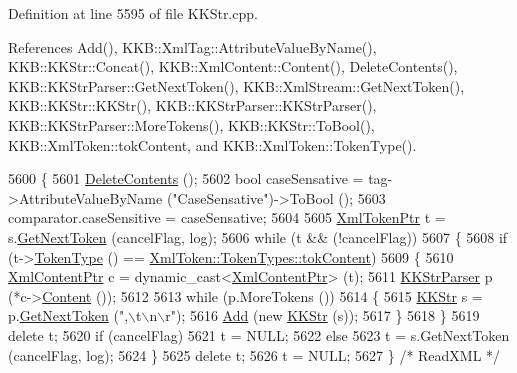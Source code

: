 Definition at line 5595 of file K\+K\+Str.\+cpp.



References Add(), K\+K\+B\+::\+Xml\+Tag\+::\+Attribute\+Value\+By\+Name(), K\+K\+B\+::\+K\+K\+Str\+::\+Concat(), K\+K\+B\+::\+Xml\+Content\+::\+Content(), Delete\+Contents(), K\+K\+B\+::\+K\+K\+Str\+Parser\+::\+Get\+Next\+Token(), K\+K\+B\+::\+Xml\+Stream\+::\+Get\+Next\+Token(), K\+K\+B\+::\+K\+K\+Str\+::\+K\+K\+Str(), K\+K\+B\+::\+K\+K\+Str\+Parser\+::\+K\+K\+Str\+Parser(), K\+K\+B\+::\+K\+K\+Str\+Parser\+::\+More\+Tokens(), K\+K\+B\+::\+K\+K\+Str\+::\+To\+Bool(), K\+K\+B\+::\+Xml\+Token\+::tok\+Content, and K\+K\+B\+::\+Xml\+Token\+::\+Token\+Type().


\begin{DoxyCode}
5600 \{
5601   \hyperlink{class_k_k_b_1_1_k_k_str_list_indexed_a4f50f6d7735d2e344c8879277c5096b7}{DeleteContents} ();
5602   \textcolor{keywordtype}{bool}  caseSensative = tag->AttributeValueByName (\textcolor{stringliteral}{"CaseSensative"})->ToBool ();
5603   comparator.caseSensitive = caseSensative;
5604 
5605   \hyperlink{class_k_k_b_1_1_xml_token}{XmlTokenPtr}  t = s.\hyperlink{class_k_k_b_1_1_xml_stream_a87cc738b05c666cf5d5c25beaab477b4}{GetNextToken} (cancelFlag, log);
5606   \textcolor{keywordflow}{while}  (t  &&  (!cancelFlag))
5607   \{
5608     \textcolor{keywordflow}{if}  (t->\hyperlink{class_k_k_b_1_1_xml_token_ae98e2c1a798882647578cae4adcd7176}{TokenType} () == \hyperlink{class_k_k_b_1_1_xml_token_a18b6e90c919f4b92e3b024f50f247f62aff369b5479984ca659548f37ad4caec9}{XmlToken::TokenTypes::tokContent})
5609     \{
5610       \hyperlink{class_k_k_b_1_1_xml_content}{XmlContentPtr} c = \textcolor{keyword}{dynamic\_cast<}\hyperlink{class_k_k_b_1_1_xml_content}{XmlContentPtr}\textcolor{keyword}{>} (t);
5611       \hyperlink{class_k_k_b_1_1_k_k_str_parser}{KKStrParser} p (*c->\hyperlink{class_k_k_b_1_1_xml_content_a1d0730aae45b069e8604bef19b8c0098}{Content} ());
5612 
5613       \textcolor{keywordflow}{while}  (p.MoreTokens ())
5614       \{
5615         \hyperlink{class_k_k_b_1_1_k_k_str}{KKStr}  s = p.\hyperlink{class_k_k_b_1_1_xml_stream_a87cc738b05c666cf5d5c25beaab477b4}{GetNextToken} (\textcolor{stringliteral}{",\(\backslash\)t\(\backslash\)n\(\backslash\)r"});
5616         \hyperlink{class_k_k_b_1_1_k_k_str_list_indexed_a70e2b10a57a8e0bb62f0f50087bbebd5}{Add} (\textcolor{keyword}{new} \hyperlink{class_k_k_b_1_1_k_k_str}{KKStr} (s));
5617       \}
5618     \}
5619     \textcolor{keyword}{delete}  t;
5620     \textcolor{keywordflow}{if}  (cancelFlag)
5621       t = NULL;
5622     \textcolor{keywordflow}{else}
5623       t = s.GetNextToken (cancelFlag, log);
5624   \}
5625   \textcolor{keyword}{delete}  t;
5626   t = NULL;
5627 \}  \textcolor{comment}{/* ReadXML */}
\end{DoxyCode}

